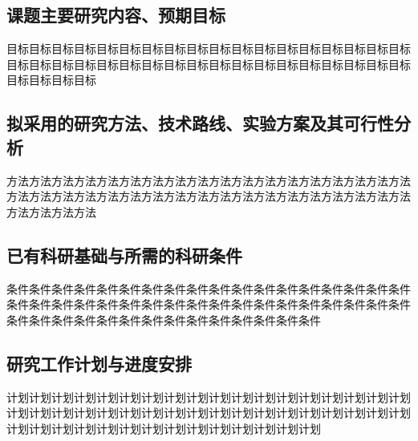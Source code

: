 \begin{SecBox}
\section{课题主要研究内容、预期目标}

目标目标目标目标目标目标目标目标目标目标目标目标目标目标目标目标目标目标目标目标目标目标目标目标目标目标目标目标目标目标目标目标目标目标目标目标目标目标目标目标

    
\end{SecBox}
\begin{SecBox}
\section{拟采用的研究方法、技术路线、实验方案及其可行性分析}

方法方法方法方法方法方法方法方法方法方法方法方法方法方法方法方法方法方法方法方法方法方法方法方法方法方法方法方法方法方法方法方法方法方法方法方法方法方法方法方法

    
\end{SecBox}
\begin{SecBox}
\section{已有科研基础与所需的科研条件}

条件条件条件条件条件条件条件条件条件条件条件条件条件条件条件条件条件条件条件条件条件条件条件条件条件条件条件条件条件条件条件条件条件条件条件条件条件条件条件条件条件条件条件条件条件条件条件条件条件条件

    
\end{SecBox}
\begin{SecBox}
\section{研究工作计划与进度安排}

计划计划计划计划计划计划计划计划计划计划计划计划计划计划计划计划计划计划计划计划计划计划计划计划计划计划计划计划计划计划计划计划计划计划计划计划计划计划计划计划计划计划计划计划计划计划计划计划计划计划

    
\end{SecBox}

\nocite{*}%
